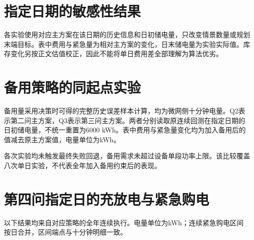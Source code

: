 \section{指定日期的敏感性结果}\label{app:sensitivity}
各实验使用对应主方案在该日期的历史信息和日初储电量，只改变情景数量或规划末端目标。表中费用与紧急量为相对主方案的变化，日末储电量为实验实际值。库存变化另按正文估值校正，因此不能将单日费用差全部理解为算法优劣。
\begin{table}[htbp]\centering\scriptsize
\caption{问题二的同起点敏感性比较}\label{tab:q2sensitivity}
\resizebox{\textwidth}{!}{}
\end{table}
\begin{table}[htbp]\centering\scriptsize
\caption{问题三的同起点敏感性比较}\label{tab:q3sensitivity}
\resizebox{\textwidth}{!}{}
\end{table}

\clearpage
\section{备用策略的同起点实验}\label{app:reserve}
备用量采用决策时可得的完整历史误差样本计算，均为微网侧十分钟电量。Q2表示第二问主方案，Q3表示第三问主方案。两者分别读取原连续回测在指定日期的日初储电量，不统一重置为6000 kWh。表中费用与紧急量变化均为加入备用后的值减去原主方案值，电量单位为kWh。
\begin{table}[htbp]\centering\scriptsize
\caption{备用策略与原主方案的同起点比较}
\resizebox{\textwidth}{!}{}
\end{table}
各次实验均未触发最终失败回退，备用需求未超过设备单段功率上限。该比较覆盖八次单日实验，不代表全年加入备用约束后的表现。

\section{第四问指定日的充放电与紧急购电}\label{app:q4selected}
以下结果均来自对应策略的全年连续执行。电量单位为kWh；连续紧急购电区间按日合并，区间端点与十分钟明细一致。
\begin{table}[htbp]\centering\small
\caption{波动电价下不调整购电策略的各四小时充放电量}

\end{table}
\begin{table}[htbp]\centering\small
\caption{波动电价下允许调整购电策略的各四小时充放电量}

\end{table}
\begin{table}[htbp]\centering\small
\caption{波动电价下不调整购电策略的紧急购电区间}

\end{table}
\begin{table}[htbp]\centering\small
\caption{波动电价下允许调整购电策略的紧急购电区间}

\end{table}
\FloatBarrier
